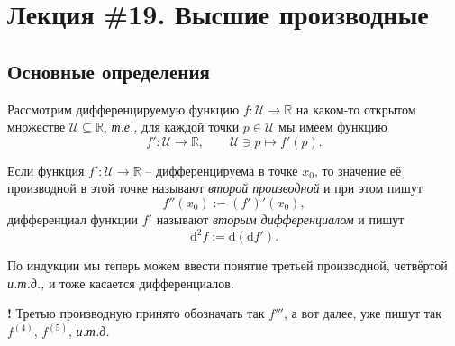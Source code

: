 \section{Лекция \#19. Высшие производные}

\subsection{Основные определения}

Рассмотрим дифференцируемую функцию $f:\mathscr{U} \to \mathbb{R}$ на каком-то открытом множестве $\mathscr{U} \subseteq \mathbb{R}$, \textit{т.е.,} для каждой точки $p\in \mathscr{U}$ мы имеем функцию
\[
 f': \mathscr{U} \to \mathbb{R}, \qquad \mathscr{U} \ni p \mapsto f'(p).
\]


\begin{definition}
Если функция $f':\mathscr{U} \to \mathbb{R}$ -- дифференцируема в точке $x_0$, то значение её производной в этой точке называют \textit{второй производной} и при этом пишут    
\[
 f''(x_0):=(f')'(x_0),
\]
дифференциал функции $f'$ называют \textit{вторым дифференциалом} и пишут
\[
 \mathrm{d}^2f:= \mathrm{d}(\mathrm{d}f').
\]
\end{definition}

По индукции мы теперь можем ввести понятие третьей производной, четвёртой \textit{и.т.д.,} и тоже касается дифференциалов. 

\begin{mydanger}{\bf !}
    Третью производную принято обозначать так $f'''$, а вот далее, уже пишут так $f^{(4)}$, $f^{(5)}$, \textit{и.т.д.}
\end{mydanger}

